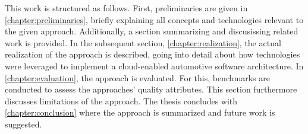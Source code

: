 This work is structured as follows. First, preliminaries are given in \autoref{chapter:preliminaries}, briefly explaining all concepts and technologies relevant to the given approach. Additionally, a section summarizing and discusissing related work is provided. In the subsequent section, \autoref{chapter:realization}, the actual realization of the approach is described, going into detail about how technologies were leveraged to implement a cloud-enabled automotive software architecture. In \autoref{chapter:evaluation}, the approach is evaluated. For this, benchmarks are conducted to assess the approaches' quality attributes. This section furthermore discusses limitations of the approach. The thesis concludes with \autoref{chapter:conclusion} where the approach is summarized and future work is suggested.

%
%
%
%
%
%
%
%
%
%
%
%
%
%
%
%
%
%
%
%
%
%
%
%
%
%
%
%
%
%
%
%
%
%
%
%
%
%
